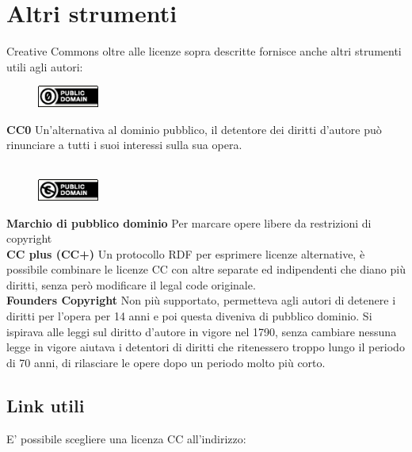 \section{Altri strumenti}

Creative Commons oltre alle licenze sopra descritte fornisce anche altri strumenti utili agli autori:\\

\begin{figure}
    \includegraphics[width=20mm]{images/CC0}
\end{figure}

\noindent \textbf{CC0} Un'alternativa al dominio pubblico, il detentore dei diritti d'autore può rinunciare a tutti i suoi interessi sulla sua opera.\\ \\

\begin{figure}
    \includegraphics[width=20mm]{images/cc_PD}
\end{figure}

\noindent \textbf{Marchio di pubblico dominio} Per marcare opere libere da restrizioni di copyright\\

\textbf{CC plus (CC+)} Un protocollo RDF per esprimere licenze alternative, è possibile combinare le licenze CC con altre separate ed indipendenti che diano più diritti, senza però modificare il legal code originale.\\

\textbf{Founders Copyright} Non più supportato, permetteva agli autori di detenere i diritti per l'opera per 14 anni e poi questa diveniva di pubblico dominio. Si ispirava alle leggi sul diritto d'autore in vigore nel 1790, senza cambiare nessuna legge in vigore aiutava i detentori di diritti che ritenessero troppo lungo il periodo di 70 anni, di rilasciare le opere dopo un periodo molto più corto.

\subsection{Link utili}

E' possibile scegliere una licenza CC all'indirizzo: \\

